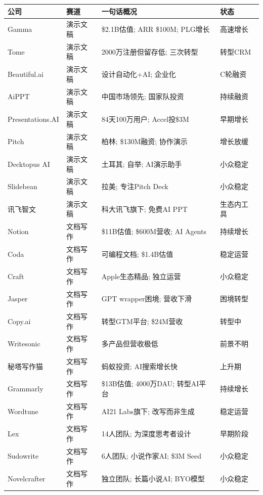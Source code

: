 \begin{keybox}[本章60+家公司状态速查表（截至2026年3月）]
\small
\begin{tabularx}{\textwidth}{l l X l}
\toprule
\rowcolor{figLightGray}
\textbf{公司} & \textbf{赛道} & \textbf{一句话概况} & \textbf{状态} \\
\midrule
Gamma          & 演示文稿 & \$2.1B估值; ARR \$100M; PLG增长 & 高速增长 \\
Tome           & 演示文稿 & 2000万注册但留存低; 三次转型 & 转型CRM \\
Beautiful.ai   & 演示文稿 & 设计自动化+AI; 企业化 & C轮融资 \\
AiPPT          & 演示文稿 & 中国市场领先; 国家队投资 & 持续融资 \\
Presentations.AI & 演示文稿 & 84天100万用户; Accel投\$3M & 早期增长 \\
Pitch          & 演示文稿 & 柏林; \$130M融资; 协作演示 & 增长放缓 \\
Decktopus AI   & 演示文稿 & 土耳其; 自举; AI演示助手 & 小众稳定 \\
Slidebean      & 演示文稿 & 拉美; 专注Pitch Deck & 小众稳定 \\
讯飞智文        & 演示文稿 & 科大讯飞旗下; 免费AI PPT & 生态内工具 \\
\midrule
Notion         & 文档写作 & \$11B估值; \$600M营收; AI Agents & 持续增长 \\
Coda           & 文档写作 & 可编程文档; \$1.4B估值 & 稳定运营 \\
Craft          & 文档写作 & Apple生态精品; 独立运营 & 小众稳定 \\
Jasper         & 文档写作 & GPT wrapper困境; 营收下滑 & 困境转型 \\
Copy.ai        & 文档写作 & 转型GTM平台; \$24M营收 & 转型中 \\
Writesonic     & 文档写作 & 多产品但营收极低 & 前景不明 \\
秘塔写作猫      & 文档写作 & 蚂蚁投资; AI搜索增长快 & 上升期 \\
Grammarly      & 文档写作 & \$13B估值; 4000万DAU; 转型AI平台 & 持续增长 \\
Wordtune       & 文档写作 & AI21 Labs旗下; 改写而非生成 & 稳定运营 \\
Lex            & 文档写作 & 14人团队; 为深度思考者设计 & 早期阶段 \\
Sudowrite      & 文档写作 & 6人团队; 小说作家AI; \$3M Seed & 小众稳定 \\
Novelcrafter   & 文档写作 & 独立团队; 长篇小说AI; BYO模型 & 小众稳定 \\

\end{tabularx}
\end{keybox}
